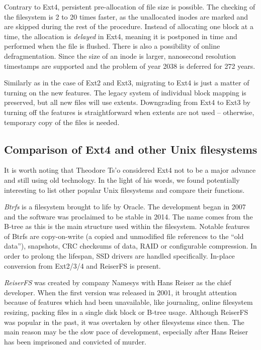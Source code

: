 \documentclass{acm_proc_article-sp}
\begin{document}
Contrary to Ext4, persistent pre-allocation of file size is possible. The checking of the filesystem is 2 to 20 times faster, as the unallocated inodes are marked and are skipped during the rest of the procedure. Instead of allocating one block at a time, the allocation is {\it delayed} in Ext4, meaning it is postponed in time and performed when the file is flushed. There is also a possibility of online defragmentation. Since the size of an inode is larger, nanosecond resolution timestamps are supported and the problem of year 2038 is deferred for 272 years.

Similarly as in the case of Ext2 and Ext3, migrating to Ext4 is just a matter of turning on the new features. The legacy system of individual block mapping is preserved, but all new files will use extents. Downgrading from Ext4 to Ext3 by turning off the features is straightforward when extents are not used -- otherwise, temporary copy of the files is needed.

\subsection{Comparison of Ext4 and other Unix filesystems}

It is worth noting that Theodore Ts'o considered Ext4 not to be a major advance and still using old technology. In the light of his words, we found potentially interesting to list other popular Unix filesystems and compare their functions.

{\it Btrfs} \cite{btrfs} is a filesystem brought to life by Oracle. The development began in 2007 and the software was proclaimed to be stable in 2014. The name comes from the B-tree as this is the main structure used within the filesystem. Notable features of Btrfs are copy-on-write (a copied and unmodified file references to the ``old data''), snapshots, CRC checksums of data, RAID or configurable compression. In order to prolong the lifespan, SSD drivers are handled specifically. In-place conversion from Ext2/3/4 and ReiserFS is present.

{\it ReiserFS} was created by company Namesys with Hans Reiser as the chief developer. When the first version was released in 2001, it brought attention because of features which had been unavailable, like journaling, online filesystem resizing, packing files in a single disk block or B-tree usage. Although ReiserFS was popular in the past, it was overtaken by other filesystems since then. The main reason may be the slow pace of development, especially after Hans Reiser has been imprisoned and convicted of murder.
\end{document}
